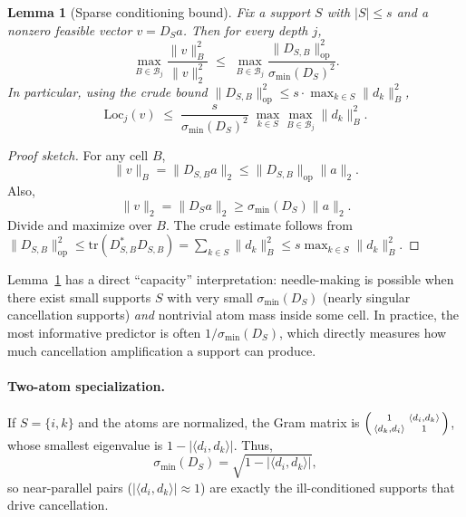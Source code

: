 \documentclass[11pt]{article}
\theoremstyle{plain}
\newtheorem{lemma}[theorem]{Lemma}
\theoremstyle{definition}
\theoremstyle{remark}
\begin{document}
\begin{lemma}[Sparse conditioning bound]\label{lem:sparse_conditioning_bound}
Fix a support \(S\) with \(|S|\le s\) and a nonzero feasible vector \(v=D_S a\).
Then for every depth \(j\),
\begin{equation}\label{eq:cond_bound_cell}
\max_{B\in\mathcal{B}_j} \frac{\|v\|_B^2}{\|v\|_2^2}
\;\le\;
\max_{B\in\mathcal{B}_j}\frac{\|D_{S,B}\|_{\mathrm{op}}^2}{\sigma_{\min}(D_S)^2}.
\end{equation}
In particular, using the crude bound \(\|D_{S,B}\|_{\mathrm{op}}^2 \le s \cdot \max_{k\in S}\|d_k\|_B^2\),
\begin{equation}\label{eq:cond_bound_crude}
\mathrm{Loc}_j(v)
\;\le\;
\frac{s}{\sigma_{\min}(D_S)^2}\;\max_{k\in S}\max_{B\in\mathcal{B}_j}\|d_k\|_B^2.
\end{equation}
\end{lemma}

\begin{proof}[Proof sketch]
For any cell \(B\),
\[
\|v\|_B = \|D_{S,B}a\|_2 \le \|D_{S,B}\|_{\mathrm{op}}\|a\|_2.
\]
Also,
\[
\|v\|_2 = \|D_S a\|_2 \ge \sigma_{\min}(D_S)\|a\|_2.
\]
Divide and maximize over \(B\).
The crude estimate follows from \(\|D_{S,B}\|_{\mathrm{op}}^2 \le \mathrm{tr}(D_{S,B}^\ast D_{S,B}) = \sum_{k\in S}\|d_k\|_B^2 \le s\max_{k\in S}\|d_k\|_B^2\).
\end{proof}

Lemma~\ref{lem:sparse_conditioning_bound} has a direct ``capacity'' interpretation:
needle-making is possible when there exist small supports \(S\) with very small \(\sigma_{\min}(D_S)\) (nearly singular cancellation supports) \emph{and} nontrivial atom mass inside some cell.
In practice, the most informative predictor is often \(1/\sigma_{\min}(D_S)\), which directly measures how much cancellation amplification a support can produce.

\paragraph{Two-atom specialization.}
If \(S=\{i,k\}\) and the atoms are normalized, the Gram matrix is
\(\begin{psmallmatrix}1 & \langle d_i,d_k\rangle\\ \langle d_k,d_i\rangle & 1\end{psmallmatrix}\),
whose smallest eigenvalue is \(1-|\langle d_i,d_k\rangle|\).
Thus,
\[
\sigma_{\min}(D_S) = \sqrt{1-|\langle d_i,d_k\rangle|},
\]
so near-parallel pairs (\(|\langle d_i,d_k\rangle|\approx 1\)) are exactly the ill-conditioned supports that drive cancellation.
\end{document}
